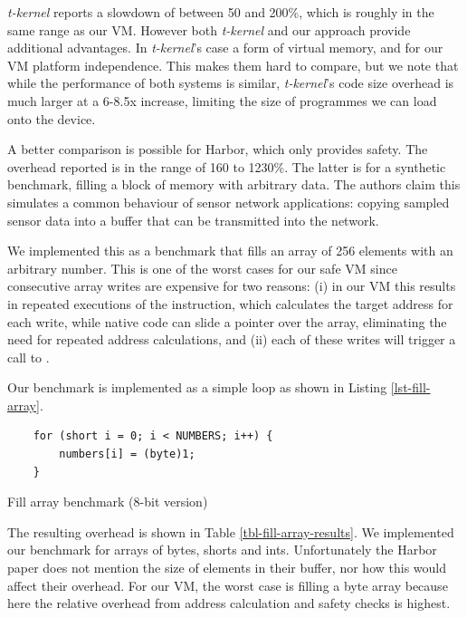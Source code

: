 \emph{t-kernel} reports a slowdown of between 50 and 200\%, which is roughly in the same range as our VM. However both \emph{t-kernel} and our approach provide additional advantages. In \emph{t-kernel}'s case a form of virtual memory, and for our VM platform independence. This makes them hard to compare, but we note that while the performance of both systems is similar, \emph{t-kernel}'s code size overhead is much larger at a 6-8.5x increase, limiting the size of programmes we can load onto the device.

A better comparison is possible for Harbor, which only provides safety. The overhead reported is in the range of 160 to 1230\%. The latter is for a synthetic benchmark, filling a block of memory with arbitrary data. The authors claim this simulates a common behaviour of sensor network applications: copying sampled sensor data into a buffer that can be transmitted into the network.

We implemented this as a benchmark that fills an array of 256 elements with an arbitrary number. This is one of the worst cases for our safe VM since consecutive array writes are expensive for two reasons: (i) in our VM this results in repeated executions of the  instruction, which calculates the target address for each write, while native code can slide a pointer over the array, eliminating the need for repeated address calculations, and (ii) each of these writes will trigger a call to .

Our benchmark is implemented as a simple loop as shown in Listing \ref{lst-fill-array}.

\begin{listing}
\begin{verbatim}
    for (short i = 0; i < NUMBERS; i++) {
        numbers[i] = (byte)1;
    }
\end{verbatim}
\caption{Fill array benchmark (8-bit version)}
\label{lst-fill-array}
\end{listing}



The resulting overhead is shown in Table \ref{tbl-fill-array-results}. We implemented our benchmark for arrays of bytes, shorts and ints. Unfortunately the Harbor paper does not mention the size of elements in their buffer, nor how this would affect their overhead. For our VM, the worst case is filling a byte array because here the relative overhead from address calculation and safety checks is highest.

